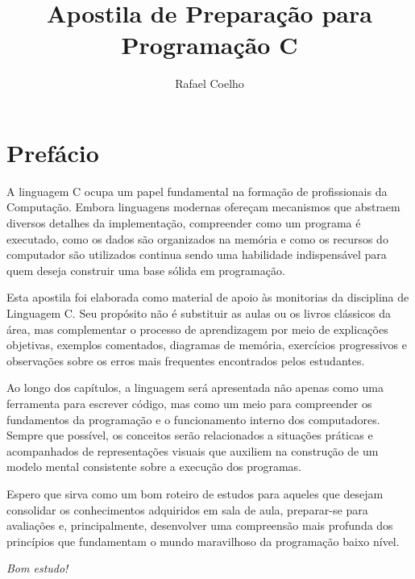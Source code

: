 \documentclass[12pt,a4paper,oneside]{extreport}
\title{\huge Apostila de Preparação para Programação \textbf{C}}
\author{Rafael Coelho}
\begin{document}
\maketitle



\chapter*{Prefácio}

A linguagem C ocupa um papel fundamental na formação de profissionais da Computação. Embora linguagens modernas ofereçam mecanismos que abstraem diversos detalhes da implementação, compreender como um programa é executado, como os dados são organizados na memória e como os recursos do computador são utilizados continua sendo uma habilidade indispensável para quem deseja construir uma base sólida em programação.

Esta apostila foi elaborada como material de apoio às monitorias da disciplina de Linguagem C. Seu propósito não é substituir as aulas ou os livros clássicos da área, mas complementar o processo de aprendizagem por meio de explicações objetivas, exemplos comentados, diagramas de memória, exercícios progressivos e observações sobre os erros mais frequentes encontrados pelos estudantes.

Ao longo dos capítulos, a linguagem será apresentada não apenas como uma ferramenta para escrever código, mas como um meio para compreender os fundamentos da programação e o funcionamento interno dos computadores. Sempre que possível, os conceitos serão relacionados a situações práticas e acompanhados de representações visuais que auxiliem na construção de um modelo mental consistente sobre a execução dos programas.

Espero que sirva como um bom roteiro de estudos para aqueles que desejam consolidar os conhecimentos adquiridos em sala de aula, preparar-se para avaliações e, principalmente, desenvolver uma compreensão mais profunda dos princípios que fundamentam o mundo maravilhoso da programação baixo nível.

\vspace{1cm}

\begin{flushright}
\textit{Bom estudo!}
\end{flushright}

\end{document}
